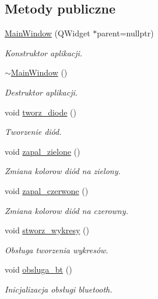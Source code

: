 \subsection*{Metody publiczne}
\begin{DoxyCompactItemize}
\item 
\hyperlink{class_main_window_a996c5a2b6f77944776856f08ec30858d}{Main\+Window} (Q\+Widget $\ast$parent=nullptr)
\begin{DoxyCompactList}\small\item\em Konstruktor aplikacji. \end{DoxyCompactList}\item 
\hyperlink{class_main_window_ae98d00a93bc118200eeef9f9bba1dba7}{$\sim$\+Main\+Window} ()
\begin{DoxyCompactList}\small\item\em Destruktor aplikacji. \end{DoxyCompactList}\item 
void \hyperlink{class_main_window_a39f01fe1c593f844a0c531b872ee0d7c}{tworz\+\_\+diode} ()
\begin{DoxyCompactList}\small\item\em Tworzenie diód. \end{DoxyCompactList}\item 
void \hyperlink{class_main_window_a24aadb4c1aaf83ce170dcf849ec6aa51}{zapal\+\_\+zielone} ()
\begin{DoxyCompactList}\small\item\em Zmiana kolorow diód na zielony. \end{DoxyCompactList}\item 
void \hyperlink{class_main_window_ad62f0406504e4f43af6fd9ebe5e96a58}{zapal\+\_\+czerwone} ()
\begin{DoxyCompactList}\small\item\em Zmiana kolorow diód na czerowny. \end{DoxyCompactList}\item 
void \hyperlink{class_main_window_a0669fa55d3cd37cef0e9e3d6e296ebd2}{stworz\+\_\+wykresy} ()
\begin{DoxyCompactList}\small\item\em Obsługa tworzenia wykresów. \end{DoxyCompactList}\item 
void \hyperlink{class_main_window_a2f5ead67e758baf55cf71b746e870192}{obsluga\+\_\+bt} ()
\begin{DoxyCompactList}\small\item\em Inicjalizacja obsługi bluetooth. \end{DoxyCompactList}\item 

\end{DoxyCompactItemize}
